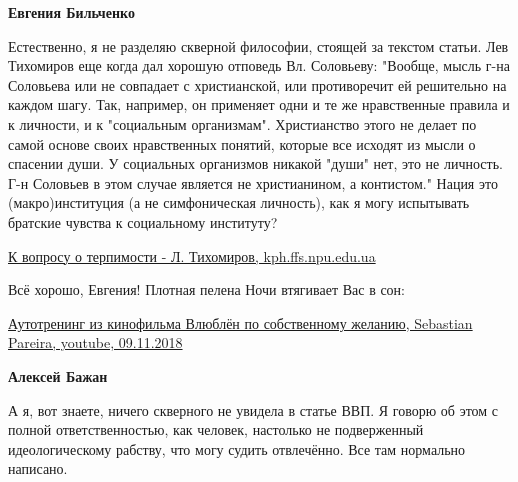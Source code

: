 \begin{itemize}
\begin{itemize}
 
\textbf{Евгения Бильченко} 

Естественно, я не разделяю скверной философии, стоящей за текстом статьи. Лев
Тихомиров еще когда дал хорошую отповедь Вл. Соловьеву: "Вообще, мысль г-на
Соловьева или не совпадает с христианской, или противоречит ей решительно на
каждом шагу. Так, например, он применяет одни и те же нравственные правила и к
личности, и к "социальным организмам". Христианство этого не делает по самой
основе своих нравственных понятий, которые все исходят из мысли о спасении
души. У социальных организмов никакой "души" нет, это не личность. Г-н Соловьев
в этом случае является не христианином, а контистом." Нация это
(макро)институция (а не симфоническая личность), как я могу испытывать братские
чувства к социальному институту?

\href{https://kph.ffs.npu.edu.ua/!e-book/clasik/data/vehi/terpimost.htm}{%
К вопросу о терпимости - Л. Тихомиров, kph.ffs.npu.edu.ua%
}


 
Всё хорошо, Евгения! Плотная пелена Ночи втягивает Вас в сон:

 
\href{https://www.youtube.com/watch?v=V-MxYCp1PJ4}{%
Аутотренинг из кинофильма Влюблён по собственному желанию, Sebastian Pareira, youtube, 09.11.2018%
}

 
\textbf{Алексей Бажан} 

А я, вот знаете, ничего скверного не увидела в статье ВВП. Я говорю об этом с
полной ответственностью, как человек, настолько не подверженный идеологическому
рабству, что могу судить отвлечённо. Все там нормально написано. 


\end{itemize}
\end{itemize}
